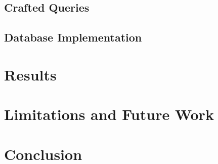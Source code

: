 \documentclass[12pt]{IEEEtran}
\begin{document}
\subsection{Crafted Queries}
\subsection{Database Implementation}

\section{Results}

\section{Limitations and Future Work}

\section{Conclusion}

\printbibliography
\end{document}
